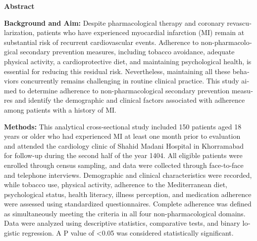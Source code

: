 \ChapterStart
\begin{latin}
\begin{center}
  {\bfseries\fontsize{14pt}{17pt}\selectfont \ThesisTitleEN\par}
  \vspace{1em}
  {\bfseries\fontsize{14pt}{17pt}\selectfont Abstract}
\end{center}
\vspace{0.8em}
\noindent\textbf{Background and Aim:}
Despite pharmacological therapy and coronary revascularization, patients who have experienced myocardial infarction (MI) remain at substantial risk of recurrent cardiovascular events. Adherence to non-pharmacological secondary prevention measures, including tobacco avoidance, adequate physical activity, a cardioprotective diet, and maintaining psychological health, is essential for reducing this residual risk. Nevertheless, maintaining all these behaviors concurrently remains challenging in routine clinical practice. This study aimed to determine adherence to non-pharmacological secondary prevention measures and identify the demographic and clinical factors associated with adherence among patients with a history of MI.

\vspace{0.45em}
\noindent\textbf{Methods:}
This analytical cross-sectional study included 150 patients aged 18 years or older who had experienced MI at least one month prior to evaluation and attended the cardiology clinic of Shahid Madani Hospital in Khorramabad for follow-up during the second half of the year 1404. All eligible patients were enrolled through census sampling, and data were collected through face-to-face and telephone interviews. Demographic and clinical characteristics were recorded, while tobacco use, physical activity, adherence to the Mediterranean diet, psychological status, health literacy, illness perception, and medication adherence were assessed using standardized questionnaires. Complete adherence was defined as simultaneously meeting the criteria in all four non-pharmacological domains. Data were analyzed using descriptive statistics, comparative tests, and binary logistic regression. A P value of <0.05 was considered statistically significant.


\end{latin}
